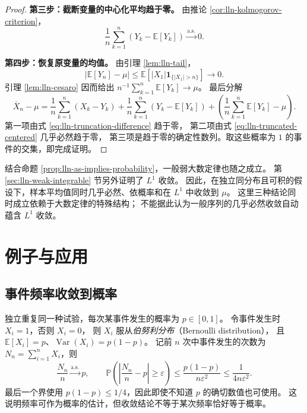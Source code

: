 \documentclass[UTF8,12pt,a4paper,fontset=fandol]{ctexart}
\begin{document}
\begin{proof}
\textbf{第三步：截断变量的中心化平均趋于零。}
由推论 \ref{cor:lln-kolmogorov-criterion}，
\begin{equation}
  \frac1n\sum_{k=1}^n(Y_k-\mathbb E[Y_k])
  \xrightarrow{\mathrm{a.s.}}0.
  \label{eq:lln-truncated-centered}
\end{equation}

\textbf{第四步：恢复原变量的均值。}
由引理 \ref{lem:lln-tail}，
\[
  |\mathbb E[Y_n]-\mu|
  \leq\mathbb E[|X_1|\mathbf1_{\{|X_1|>n\}}]\longrightarrow0.
\]
引理 \ref{lem:lln-cesaro} 因而给出
$n^{-1}\sum_{k=1}^n\mathbb E[Y_k]\to\mu$。
最后分解
\[
  \overline X_n-\mu
  =\frac1n\sum_{k=1}^n(X_k-Y_k)
   +\frac1n\sum_{k=1}^n(Y_k-\mathbb E[Y_k])
   +\left(\frac1n\sum_{k=1}^n\mathbb E[Y_k]-\mu\right).
\]
第一项由式 \eqref{eq:lln-truncation-difference} 趋于零，
第二项由式 \eqref{eq:lln-truncated-centered} 几乎必然趋于零，
第三项是趋于零的确定性数列。取这些概率为 $1$ 的事件的交集，即完成证明。
\end{proof}

结合命题 \ref{prop:lln-as-implies-probability}，一般弱大数定律也随之成立。
第 \ref{sec:lln-weak-integrable} 节另外证明了 $L^1$ 收敛。
因此，在独立同分布且可积的假设下，样本平均值同时几乎必然、依概率和在 $L^1$ 中收敛到 $\mu$。
这里三种结论同时成立依赖于大数定律的特殊结构；
不能据此认为一般序列的几乎必然收敛自动蕴含 $L^1$ 收敛。

\section{例子与应用}
\label{sec:lln-applications}

\subsection{事件频率收敛到概率}

\begin{example}[伯努利大数定律]
\label{ex:lln-bernoulli}
独立重复同一种试验，每次某事件发生的概率为 $p\in[0,1]$。
令事件发生时 $X_i=1$，否则 $X_i=0$，
则 $X_i$ 服从\emph{伯努利分布}（Bernoulli distribution），
且 $\mathbb E[X_i]=p$、$\operatorname{Var}(X_i)=p(1-p)$。
记前 $n$ 次中事件发生的次数为 $N_n=\sum_{i=1}^nX_i$，则
\[
  \frac{N_n}{n}\xrightarrow{\mathrm{a.s.}}p,
  \qquad
  \mathbb P\left(\left|\frac{N_n}{n}-p\right|\geq\varepsilon\right)
  \leq\frac{p(1-p)}{n\varepsilon^2}
  \leq\frac1{4n\varepsilon^2}.
\]
最后一个界使用 $p(1-p)\leq1/4$，因此即使不知道 $p$ 的确切数值也可使用。
这说明频率可作为概率的估计，但收敛结论不等于某次频率恰好等于概率。
\end{example}
\end{document}
